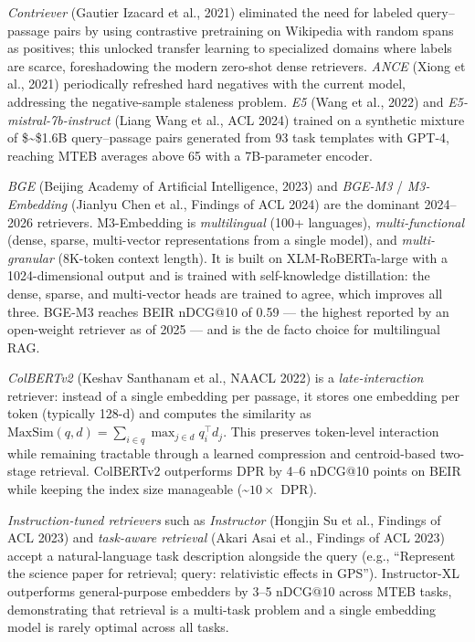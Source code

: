 \emph{Contriever} (Gautier Izacard et al., 2021) eliminated the need for labeled query--passage pairs by using contrastive pretraining on Wikipedia with random spans as positives; this unlocked transfer learning to specialized domains where labels are scarce, foreshadowing the modern zero-shot dense retrievers. \emph{ANCE} (Xiong et al., 2021) periodically refreshed hard negatives with the current model, addressing the negative-sample staleness problem. \emph{E5} (Wang et al., 2022) and \emph{E5-mistral-7b-instruct} (Liang Wang et al., ACL 2024) trained on a synthetic mixture of \$\sim\$1.6B query--passage pairs generated from 93 task templates with GPT-4, reaching MTEB averages above 65 with a 7B-parameter encoder.

\emph{BGE} (Beijing Academy of Artificial Intelligence, 2023) and \emph{BGE-M3} / \emph{M3-Embedding} (Jianlyu Chen et al., Findings of ACL 2024) are the dominant 2024--2026 retrievers. M3-Embedding is \emph{multilingual} (100+ languages), \emph{multi-functional} (dense, sparse, multi-vector representations from a single model), and \emph{multi-granular} (8K-token context length). It is built on XLM-RoBERTa-large with a 1024-dimensional output and is trained with self-knowledge distillation: the dense, sparse, and multi-vector heads are trained to agree, which improves all three. BGE-M3 reaches BEIR nDCG@10 of 0.59 --- the highest reported by an open-weight retriever as of 2025 --- and is the de facto choice for multilingual RAG.

\emph{ColBERTv2} (Keshav Santhanam et al., NAACL 2022) is a \emph{late-interaction} retriever: instead of a single embedding per passage, it stores one embedding per token (typically 128-d) and computes the similarity as \(\text{MaxSim}(q, d) = \sum_{i \in q} \max_{j \in d} q_i^\top d_j\). This preserves token-level interaction while remaining tractable through a learned compression and centroid-based two-stage retrieval. ColBERTv2 outperforms DPR by 4--6 nDCG@10 points on BEIR while keeping the index size manageable (\textasciitilde{}\(10\times\) DPR).

\emph{Instruction-tuned retrievers} such as \emph{Instructor} (Hongjin Su et al., Findings of ACL 2023) and \emph{task-aware retrieval} (Akari Asai et al., Findings of ACL 2023) accept a natural-language task description alongside the query (e.g., ``Represent the science paper for retrieval; query: relativistic effects in GPS''). Instructor-XL outperforms general-purpose embedders by 3--5 nDCG@10 across MTEB tasks, demonstrating that retrieval is a multi-task problem and a single embedding model is rarely optimal across all tasks.

